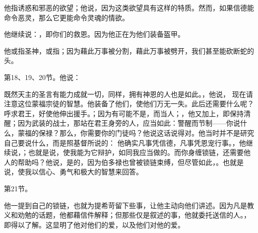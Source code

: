 他指诱惑和邪恶的欲望；他说，因为这类欲望具有这样的特质。然而，如果信德能命令恶灵，那么它更能命令灵魂的情欲。\par

他继续说：，即你们的救恩。因为他正在为他们装备盔甲。\par

他或指圣神，或指；因为藉此万事被分割，藉此万事被劈开，我们甚至能砍断蛇的头。\par

第18、19、20节。他说：\par

既然天主的圣言有能力成就一切，同样，拥有神恩的人也是如此。，他说， 现在请注意这位蒙福宗徒的智慧。他装备了他们，使他们万无一失。此后还需要什么呢？呼求君王，好使他伸出援手。；因为有可能不是，而当人；，他又加上，即保持清醒；因为武装的战士，那站在君王身旁的人，应当如此：警醒而节制——你说什么，蒙福的保禄？那么，你需要你的门徒吗？他说这话说得对。他当时并不是研究自己要说什么，而是照基督所说的： 他确实凡事凭信德，凡事凭恩宠行事。，他继续说，；也就是说，使我能为它辩护，如同我应当做的。而你身缠锁链，还需要他人的帮助吗？他说，是的，因为伯多禄也曾被锁链束缚，但尽管如此，。也就是说，使我以信心、勇气和极大的智慧来回答。\par

第21节。\par

他一提到自己的锁链，也就为提希苛留下些事，让他主动向他们讲述。因为凡是教义和劝勉的话题，他都藉信件解释；但那些仅是叙述的事，他就委托送信的人。，即得以了解。这显明了他对他们的爱，以及他们对他的爱。\par

